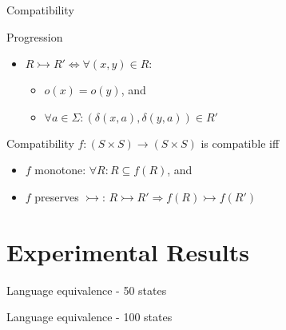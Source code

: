 \documentclass[compress]{beamer}
\begin{document}
\begin{frame}{Compatibility}
  \begin{block}{Progression}
    \begin{itemize}
      \item $R \rightarrowtail R' \Leftrightarrow \forall (x, y) \in R:$\\
        \begin{itemize}
          \item $o(x) = o(y)$, and
          \item $\forall a \in \Sigma: (\delta(x, a), \delta(y, a)) \in R'$
        \end{itemize}
    \end{itemize}
  \end{block}

  \begin{block}{Compatibility}
    $f : (S \times S) \to (S \times S)$ is compatible iff \\
    \begin{itemize}
      \item $f$ monotone: $\forall R: R \subseteq f(R)$, and
      \item $f$ preserves $\rightarrowtail$:
        $R \rightarrowtail R' \Rightarrow f(R) \rightarrowtail f(R')$
    \end{itemize}
  \end{block}
\end{frame}

\section{Experimental Results}

\begin{frame}{Language equivalence - 50 states}
  \begin{figure}
    
  \end{figure}
\end{frame}

\begin{frame}{Language equivalence - 100 states}
  \begin{figure}
    
  \end{figure}
\end{frame}
\end{document}

